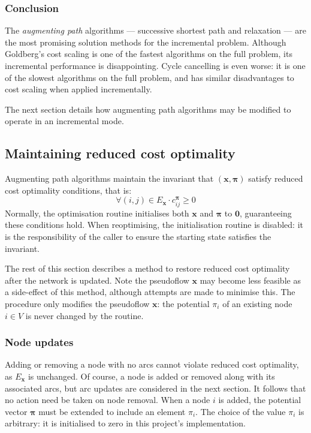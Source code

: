 \subsubsection{Conclusion}

The \emph{augmenting path} algorithms --- successive shortest path and relaxation --- are the most promising solution methods for the incremental problem. Although Goldberg's cost scaling is one of the fastest algorithms on the full problem, its incremental performance is disappointing. Cycle cancelling is even worse: it is one of the slowest algorithms on the full problem, and has similar disadvantages to cost scaling when applied incrementally.

The next section details how augmenting path algorithms may be modified to operate in an incremental mode.

\subsection{Maintaining reduced cost optimality} \label{sec:impl-incremental-maintaining-rc}

Augmenting path algorithms maintain the invariant that $\left(\mathbf{x},\boldsymbol{\pi}\right)$ satisfy reduced cost optimality conditions, that is:
\[\forall(i,j)\in E_{\mathbf{x}}\cdot c_{ij}^{\boldsymbol{\pi}}\geq 0\]
Normally, the optimisation routine initialises both $\mathbf{x}$ and $\boldsymbol{\pi}$ to $\mathbf{0}$, guaranteeing these conditions hold. When reoptimising, the initialisation routine is disabled: it is the responsibility of the caller to ensure the starting state satisfies the invariant.

The rest of this section describes a method to restore reduced cost optimality after the network is updated. Note the pseudoflow $\mathbf{x}$ may become less feasible as a side-effect of this method, although attempts are made to minimise this. The procedure only modifies the pseudoflow $\mathbf{x}$: the potential $\pi_i$ of an existing node $i \in V$ is never changed by the routine.

\subsubsection{Node updates}

Adding or removing a node with no arcs cannot violate reduced cost optimality, as $E_\mathbf{x}$ is unchanged. Of course, a node is added or removed along with its associated arcs\footnotemark, but arc updates are considered in the next section. It follows that no action need be taken on node removal. When a node $i$ is added, the potential vector $\boldsymbol{\pi}$ must be extended to include an element $\pi_i$. The choice of the value $\pi_i$ is arbitrary: it is initialised to zero in this project's implementation.

